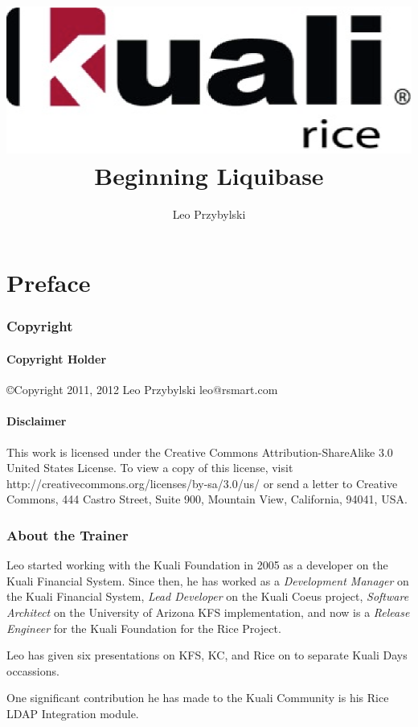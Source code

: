 \documentclass[letterpaper,notitlepage,12pt]{book}
\author{Leo Przybylski}
\title{\includegraphics[width=\textwidth]{cover.eps}\\Beginning Liquibase}
\date{}
\begin{document}
\maketitle
\tableofcontents

\part*{Preface}

\section*{Copyright}
\subsection*{Copyright Holder}
\copyright Copyright 2011, 2012
Leo Przybylski
leo@rsmart.com

\subsection*{Disclaimer}
This work is licensed under the Creative Commons Attribution-ShareAlike 3.0 United States License. To view a copy of this license, visit http://creativecommons.org/licenses/by-sa/3.0/us/ or send a letter to Creative Commons, 444 Castro Street, Suite 900, Mountain View, California, 94041, USA.

\section*{About the Trainer}
Leo started working with the Kuali Foundation in 2005 as a developer
on the Kuali Financial System. Since then, he has worked as a
\emph{Development Manager} on the Kuali Financial System, \emph{Lead Developer} on
the Kuali Coeus project, \emph{Software Architect} on the University of
Arizona KFS implementation, and now is a \emph{Release Engineer} for the
Kuali Foundation for the Rice Project. 

Leo has given six presentations on KFS, KC, and Rice on to separate
Kuali Days occassions. 

One significant contribution he has made to the Kuali Community is his
Rice LDAP Integration module.

\end{document}
